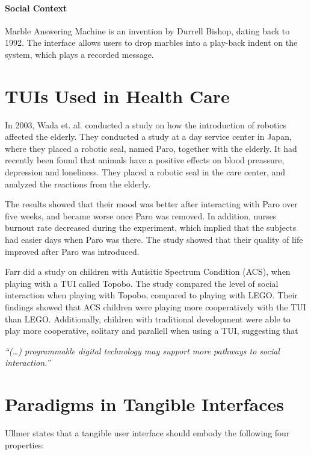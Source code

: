  
\paragraph{Social Context}
Marble Answering Machine is an invention by Durrell Bishop, dating back to 1992\cite{crampton1995hand}. The interface allows users to drop marbles into a play-back indent on the system, which plays a recorded message.   


\section{TUIs Used in Health Care}
\label{sec:effectofrobots}
In 2003, Wada et. al. conducted a study on how the introduction of robotics affected the elderly\cite{wada2004effects}. They conducted a study at a day service center in Japan, where they placed a robotic seal, named Paro, together with the elderly. It had recently been found that animals have a positive effects on blood preassure, depression and loneliness. They placed a robotic seal in the care center, and analyzed the reactions from the elderly. 

The results showed that their mood was better after interacting with Paro over five weeks, and became worse once Paro was removed. In addition, nurses burnout rate decreased during the experiment, which implied that the subjects had easier days when Paro was there. The study showed that their quality of life improved after Paro was introduced.           

Farr \etal{} did a study on children with Autisitic Spectrum Condition (ACS), when playing with a TUI called Topobo\cite{farr2010social}. The study compared the level of social interaction when playing with Topobo, compared to playing with LEGO. Their findings showed that ACS children were playing more cooperatively with the TUI than LEGO. Additionally, children with traditional development were able to play more cooperative, solitary and parallell when using a TUI, suggesting that 

\textit{``(\ldots) programmable digital technology may support more pathways to social interaction.''}

\section{Paradigms in Tangible Interfaces}
Ullmer states that a tangible user interface should embody the following four properties\cite{ullmer2002tangible}:

